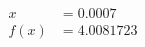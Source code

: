 \documentclass[preview]{standalone}
\begin{document}
\begin{align*}
x &= 0.0007\\f(x) &= 4.0081723
\end{align*}
\end{document}
